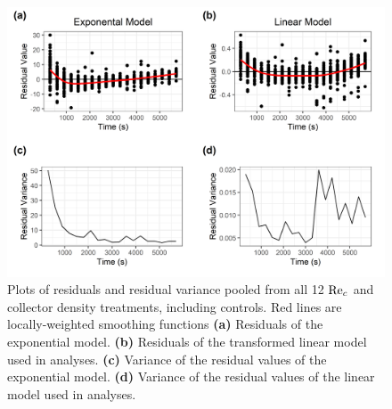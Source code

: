 \documentclass[geosciences,article,submit,moreauthors,pdftex]{Definitions/mdpi}
\begin{document}
\begin{figure}[H]
\centering
\includegraphics[width=5.5in]{../pics/heterosked.png}
\caption{Plots of residuals and residual variance pooled from all 12 $\mathrm{Re}_c$ and collector density treatments, including controls. Red lines are locally-weighted smoothing functions \textbf{(a)} Residuals of the exponential model. \textbf{(b)} Residuals of the transformed linear model used in analyses. \textbf{(c)} Variance of the residual values of the exponential model. \textbf{(d)} Variance of the residual values of the linear model used in analyses.}
\label{fig:heterosked}
\end{figure}



\end{document}
